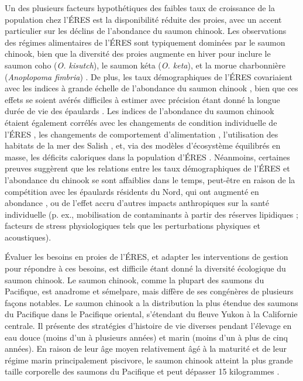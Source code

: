 Un des plusieurs facteurs hypothétiques des faibles taux de croissance de la population chez l'ÉRES est la disponibilité réduite des proies, avec un accent particulier sur les déclins de l'abondance du saumon chinook. Les observations des régimes alimentaires de l'ÉRES sont typiquement dominées par le saumon chinook, bien que la diversité des proies augmente en hiver pour inclure le saumon coho (\textit{O. kisutch}), le saumon kéta (\textit{O. keta}), et la morue charbonnière (\textit{Anoplopoma fimbria}) \citep{fordLinkingKillerWhale2010, fordEstimationKillerWhale2016, hansonEndangeredPredatorsEndangered2021}. De plus, les taux démographiques de l'ÉRES covariaient avec les indices à grande échelle de l'abondance du saumon chinook \citep{wardIncreasedPopulationDensity2009, fordLinkingKillerWhale2010}, bien que ces effets se soient avérés difficiles à estimer avec précision étant donné la longue durée de vie des épaulards \citep{velez-espinoRelativeImportanceChinook2015}. Les indices de l'abondance du saumon chinook étaient également corrélés avec les changements de condition individuelle de l'ÉRES \citep{stewartSurvivalFattestLinking2021}, les changements de comportement d'alimentation \citep{holtEffectsVesselDistance2021}, l'utilisation des habitats de la mer des Salish \citep{ettingerShiftingPhenologyEndangered2022, stewartTraditionalSummerHabitat2023}, et, via des modèles d'écosystème équilibrés en masse, les déficits caloriques dans la population d'ÉRES \citep{coutureRequirementsAvailabilityPrey2022}. Néanmoins, certaines preuves suggèrent que les relations entre les taux démographiques de l'ÉRES et l'abondance du chinook se sont affaiblies dans le temps, peut-être en raison de la compétition avec les épaulards résidents du Nord, qui ont augmenté en abondance \citep{nelsonIdentifyingDriversDemographic2024}, ou de l'effet accru d'autres impacts anthropiques sur la santé individuelle (p. ex., mobilisation de contaminants à partir des réserves lipidiques ; facteurs de stress physiologiques tels que les perturbations physiques et acoustiques).

Évaluer les besoins en proies de l'ÉRES, et adapter les interventions de gestion pour répondre à ces besoins, est difficile étant donné la diversité écologique du saumon chinook. Le saumon chinook, comme la plupart des saumons du Pacifique, est anadrome et sémelpare, mais diffère de ses congénères de plusieurs façons notables. Le saumon chinook a la distribution la plus étendue des saumons du Pacifique dans le Pacifique oriental, s'étendant du fleuve Yukon à la Californie centrale. Il présente des stratégies d'histoire de vie diverses pendant l'élevage en eau douce (moins d'un à plusieurs années) et marin (moins d'un à plus de cinq années). En raison de leur âge moyen relativement âgé à la maturité et de leur régime marin principalement piscivore, le saumon chinook atteint la plus grande taille corporelle des saumons du Pacifique et peut dépasser 15 kilogrammes \citep{healeyLifeHistoryChinook1991}.

